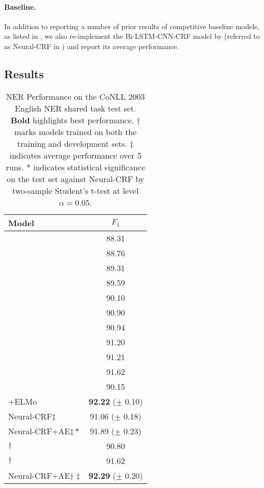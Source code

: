 \paragraph{Baseline.}
In addition to reporting a number of prior results of competitive baseline models, as listed in , we also re-implement the Bi-LSTM-CNN-CRF model by  (referred to as Neural-CRF in ) and report its average performance.


\subsection{Results}
\begin{table}[tb]
\centering
\small
\begin{tabular}{lc}
\toprule
Model                     & $F_1$ \\
\midrule
\citet{chieu2002named} & 88.31 \\
\citet{florian2003named} & 88.76 \\
\citet{ando2005framework} & 89.31 \\
\citet{collobert2011natural}   & 89.59       \\
\citet{huang2015bidirectional} & 90.10       \\
\citet{passos2014lexicon}      & 90.90       \\
\citet{lample2016neural}       & 90.94       \\
\citet{luo2015joint}           & 91.20       \\
\citet{ma2016end}              & 91.21       \\
\citet{yang2017neural}         & 91.62 \\
\citet{Peters+:2018}           & 90.15 \\
\citet{Peters+:2018}+ELMo      & \textbf{92.22} ($\pm$ 0.10) \\
Neural-CRF$\ddagger$           & 91.06 ($\pm$ 0.18)  \\
Neural-CRF+AE$\ddagger*$       & 91.89 ($\pm$ 0.23)    \\ 
\midrule
\citet{ratinov2009design}$\dagger$ & 90.80       \\
\citet{chiu2016named}$\dagger$     & 91.62       \\ 
Neural-CRF+AE$\dagger$ $\ddagger$ & \textbf{92.29} ($\pm$ 0.20)\\
\bottomrule
\end{tabular}
\caption{NER Performance on the CoNLL 2003 English NER shared task test set. \textbf{Bold} highlights best performance. $\dagger$ marks models trained on both the training and development sets. $\ddagger$ indicates average performance over 5 runs. $*$ indicates statistical significance on the test set against Neural-CRF by two-sample Student's t-test at level $\alpha=0.05$.}
\label{table1}
\end{table}

